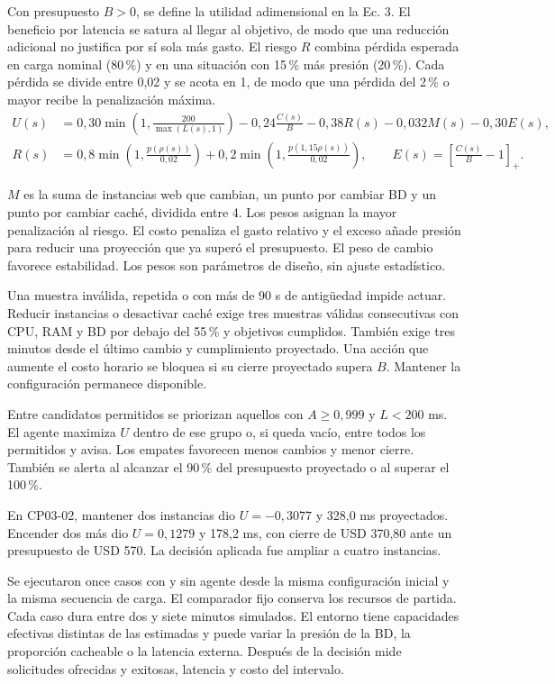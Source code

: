 \documentclass[12pt,letterpaper]{article}
\newcommand{\niveluno}[1]{\par\vspace{.35\baselineskip}\noindent\makebox[\linewidth][c]{\textbf{#1}}\par}
\begin{document}
Con presupuesto $B>0$, se define la utilidad adimensional en la Ec. 3. El beneficio por latencia se satura al llegar al objetivo, de modo que una reducción adicional no justifica por sí sola más gasto. El riesgo $R$ combina pérdida esperada en carga nominal (80\,\%) y en una situación con 15\,\% más presión (20\,\%). Cada pérdida se divide entre 0,02 y se acota en 1, de modo que una pérdida del 2\,\% o mayor recibe la penalización máxima.
\begin{align}
 U(s)&=0{,}30\min\!\left(1,\frac{200}{\max(L(s),1)}\right)
      -0{,}24\frac{C(s)}{B}-0{,}38R(s)-0{,}032M(s)-0{,}30E(s),\\
 R(s)&=0{,}8\min\!\left(1,\frac{p(\rho(s))}{0{,}02}\right)
      +0{,}2\min\!\left(1,\frac{p(1{,}15\rho(s))}{0{,}02}\right),\!
 \qquad E(s)=\left[\frac{C(s)}{B}-1\right]_+ .
\end{align}

$M$ es la suma de instancias web que cambian, un punto por cambiar BD y un punto por cambiar caché, dividida entre 4. Los pesos asignan la mayor penalización al riesgo. El costo penaliza el gasto relativo y el exceso añade presión para reducir una proyección que ya superó el presupuesto. El peso de cambio favorece estabilidad. Los pesos son parámetros de diseño, sin ajuste estadístico.

Una muestra inválida, repetida o con más de 90 s de antigüedad impide actuar. Reducir instancias o desactivar caché exige tres muestras válidas consecutivas con CPU, RAM y BD por debajo del 55\,\% y objetivos cumplidos. También exige tres minutos desde el último cambio y cumplimiento proyectado. Una acción que aumente el costo horario se bloquea si su cierre proyectado supera $B$. Mantener la configuración permanece disponible.

Entre candidatos permitidos se priorizan aquellos con $A\geq0{,}999$ y $L<200$ ms. El agente maximiza $U$ dentro de ese grupo o, si queda vacío, entre todos los permitidos y avisa. Los empates favorecen menos cambios y menor cierre. También se alerta al alcanzar el 90\,\% del presupuesto proyectado o al superar el 100\,\%.

En CP03-02, mantener dos instancias dio $U=-0{,}3077$ y 328,0 ms proyectados. Encender dos más dio $U=0{,}1279$ y 178,2 ms, con cierre de USD 370,80 ante un presupuesto de USD 570. La decisión aplicada fue ampliar a cuatro instancias.

\newpage
\niveluno{Diseño de pruebas}

Se ejecutaron once casos con y sin agente desde la misma configuración inicial y la misma secuencia de carga. El comparador fijo conserva los recursos de partida. Cada caso dura entre dos y siete minutos simulados. El entorno tiene capacidades efectivas distintas de las estimadas y puede variar la presión de la BD, la proporción cacheable o la latencia externa. Después de la decisión mide solicitudes ofrecidas y exitosas, latencia y costo del intervalo.
\end{document}
